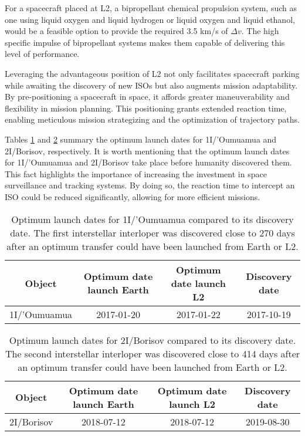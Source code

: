 For a spacecraft placed at L2, a bipropellant chemical propulsion system, such
as one using liquid oxygen and liquid hydrogen or liquid oxygen and liquid
ethanol, would be a feasible option to provide the required 3.5 km/s of $\Delta
  v$. The high specific impulse of bipropellant systems makes them capable of
delivering this level of performance.

Leveraging the advantageous position of L2 not only facilitates spacecraft
parking while awaiting the discovery of new ISOs but also augments mission
adaptability. By pre-positioning a spacecraft in space, it affords greater
maneuverability and flexibility in mission planning. This positioning grants
extended reaction time, enabling meticulous mission strategizing and the
optimization of trajectory paths.

Tables \ref{tab:optimum-launch-dates-oumuamua} and
\ref{tab:optimum-launch-dates-borisov} summary the optimum launch dates for
1I/'Oumuamua and 2I/Borisov, respectively. It is worth mentioning that the
optimum launch dates for 1I/'Oumuamua and 2I/Borisov take place before humanity
discovered them. This fact highlights the importance of increasing the
investment in space surveillance and tracking systems. By doing so, the reaction
time to intercept an ISO could be reduced significantly, allowing for more
efficient missions.

\vspace{1cm}
\begin{table}[H]
  \centering
  \begin{tabular}{|c|c|c|c|}
    \hline
    Object       & Optimum date launch Earth & Optimum date launch L2 & Discovery date \\
    \hline
    1I/'Oumuamua & 2017-01-20                & 2017-01-22             & 2017-10-19     \\
    \hline
  \end{tabular}
  \caption[Optimum launch dates for 1I/'Oumuamua compared to discovery its
    discovery date]{Optimum launch dates for
    1I/'Oumuamua compared to its discovery date. The first interstellar
    interloper was discovered close to 270 days after an optimum transfer
    could have been launched from Earth or L2.}
  \label{tab:optimum-launch-dates-oumuamua}
\end{table}

\vspace{1cm}
\begin{table}[H]
  \centering
  \begin{tabular}{|c|c|c|c|}
    \hline
    Object     & Optimum date launch Earth & Optimum date launch L2 & Discovery date \\
    \hline
    2I/Borisov & 2018-07-12                & 2018-07-12             & 2019-08-30     \\
    \hline
  \end{tabular}
  \caption[Optimum launch dates for 2I/Borisov compared to discovery its
    discovery date]{Optimum launch dates for
    2I/Borisov compared to its discovery date. The second interstellar
    interloper was discovered close to 414 days after an optimum transfer
    could have been launched from Earth or L2.}
  \label{tab:optimum-launch-dates-borisov}
\end{table}

